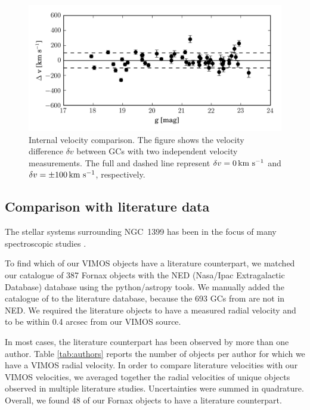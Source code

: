 \begin{figure}
\centering
\includegraphics[width=\columnwidth]{figures/internal.png} 
\caption{Internal velocity comparison. The figure shows the velocity difference 
$\delta v$ between  GCs with two independent velocity measurements. The full 
and dashed line represent $\delta v = 0 \mbox{\,km~s$^{-1}$}$ and $\delta v = \pm 100 \mbox{\,km~s$^{-1}$}$, 
respectively. }
\label{fig:internal}
\end{figure}

\subsection{Comparison with literature data}

The stellar systems surrounding NGC~1399 has been in the focus of many 
spectroscopic studies
\citep{Dirsch04, Schuberth10, Bergond07, Firth07, Chilingarian11, Mieske04, 
Hilker07, Francis12, Drinkwater00}.

To find which of our VIMOS objects have a literature counterpart, we matched 
our catalogue of 387 Fornax objects with the NED (Nasa/Ipac Extragalactic 
Database) database using the python/astropy tools. 
We manually added the catalogue of \citet{Schuberth} to the literature 
database, because the 693 GCs from \citet{Schuberth} are not in NED. We 
required the literature objects to have a measured radial velocity and to be 
within 0.4 arcsec from our VIMOS source. 

In most cases, the literature counterpart has been observed by more than one 
author. Table \ref{tab:authors} reports the number of objects per author for 
which we have a VIMOS radial velocity. 
In order to compare literature velocities with our VIMOS velocities, we 
averaged together the radial velocities of unique objects observed in multiple 
literature studies. Uncertainties were summed in quadrature. Overall, we found 
48 of our Fornax objects to have a literature counterpart. 


